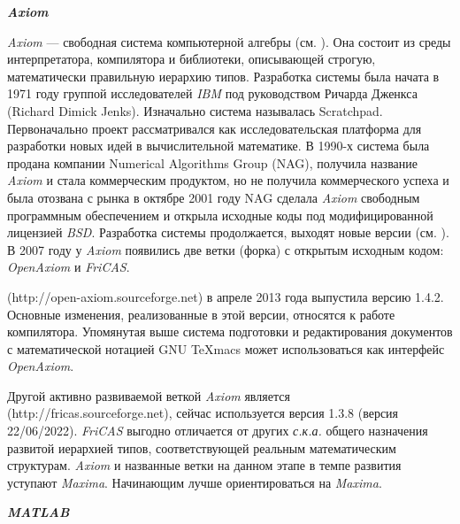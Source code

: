 \textbf{\textit{Axiom}}

\textit{Axiom} --- свободная система компьютерной алгебры (см. ). Она состоит из среды интерпретатора, компилятора и библиотеки, описывающей строгую, математически правильную иерархию типов. Разработка системы была начата в 1971 году группой исследователей \textit{IBM} под руководством Ричарда Дженкса (Richard Dimick Jenks). Изначально система называлась Scratchpad. Первоначально проект рассматривался как исследовательская платформа для разработки новых идей в вычислительной математике. В 1990-х система была продана компании Numerical Algorithms Group (NAG), получила название \textit{Axiom} и стала коммерческим продуктом, но не получила коммерческого успеха и была отозвана с рынка в октябре 2001 году NAG сделала \textit{Axiom} свободным программным обеспечением и открыла исходные коды под модифицированной лицензией \textit{BSD}. Разработка системы продолжается, выходят новые версии (см. ). В 2007 году у \textit{Axiom} появились две ветки (форка) с открытым исходным кодом: \textit{OpenAxiom} и \textit{FriCAS}.

 (http://open-axiom.sourceforge.net) в апреле 2013 года выпустила версию 1.4.2. Основные изменения, реализованные в этой версии, относятся к работе компилятора. Упомянутая выше система подготовки и редактирования документов с математической нотацией GNU TeXmacs может использоваться как интерфейс \textit{OpenAxiom}.

Другой активно развиваемой веткой \textit{Axiom} является  (http://fricas.sourceforge.net), сейчас используется версия 1.3.8 (версия 22/06/2022). \textit{FriCAS} выгодно отличается от других \textit{с.к.а.} общего назначения развитой иерархией типов, соответствующей реальным математическим структурам.
\textit{Axiom} и названные ветки на данном этапе в темпе развития уступают \textit{Maxima}. Начинающим лучше ориентироваться на \textit{Maxima}.


\textbf{\textit{MATLAB}}

